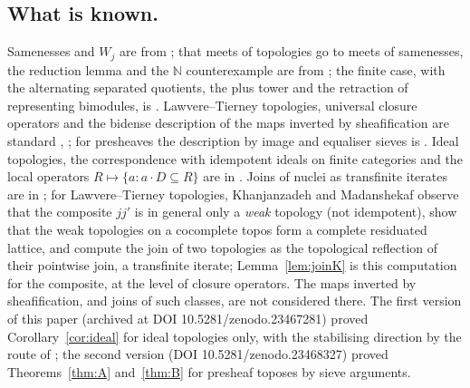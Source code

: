 \documentclass[11pt]{amsart}
\theoremstyle{definition}
\begin{document}
\subsection*{What is known.}
Samenesses and $W_j$ are from \cite{Same}; that meets of topologies go to
meets of samenesses, the reduction lemma and the $\mathbb N$ counterexample are
from \cite{Topjoin}; the finite case, with the alternating separated
quotients, the plus tower and the retraction of representing bimodules, is
\cite{Finitejoin}. Lawvere--Tierney topologies, universal closure operators
and the bidense description of the maps inverted by sheafification are
standard \cite[V.1, V.3]{MLM}, \cite[A4.3--A4.4]{Elephant}; for presheaves
the description by image and equaliser sieves is \cite[III.7]{MLM}. Ideal
topologies, the correspondence with idempotent ideals on finite categories
and the local operators $R\mapsto\{a:a\cdot D\subseteq R\}$ are in
\cite{KL89,Marques25,Postnikov}. Joins of nuclei as transfinite iterates are
in \cite{Escardo}; for Lawvere--Tierney topologies, Khanjanzadeh and
Madanshekaf \cite{KM} observe that the composite $jj'$ is in general only a
\emph{weak} topology (not idempotent), show that the weak topologies on a
cocomplete topos form a complete residuated lattice, and compute the join of
two topologies as the topological reflection of their pointwise join, a
transfinite iterate; Lemma~\ref{lem:joinK} is this computation for the
composite, at the level of closure operators. The maps inverted by
sheafification, and joins of such classes, are not considered there. The
first version of this paper (archived at DOI
10.5281/zenodo.23467281) proved Corollary~\ref{cor:ideal} for ideal
topologies only, with the stabilising direction by the route of
\cite{Finitejoin}; the second version (DOI 10.5281/zenodo.23468327) proved
Theorems~\ref{thm:A} and~\ref{thm:B} for presheaf toposes by sieve
arguments.
\end{document}
